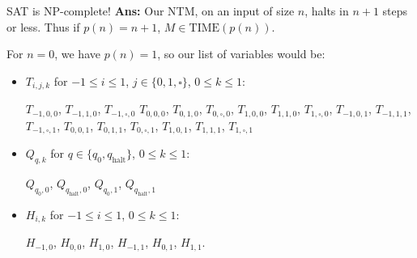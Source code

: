 \documentclass{beamer}
\begin{document}
\begin{frame}{SAT is NP-complete!}
\textbf{Ans:} Our NTM, on an input of size $n$, halts in $n + 1$ steps or less. Thus if $p(n) = n + 1$, $M \in \mathrm{TIME}(p(n))$.

For $n = 0$, we have $p(n) = 1$, so our list of variables would be:

\begin{itemize}
    \item $T_{i, j, k}$ for $-1 \leq i \leq 1$, $j \in \{0, 1, \square\}$, $0 \leq k \leq 1$:
    
   $T_{-1, 0, 0}$, $T_{-1, 1, 0}$, $T_{-1, \square, 0}$ $T_{0, 0, 0}$, $T_{0, 1, 0}$, $T_{0, \square, 0}$, $T_{1, 0, 0}$, $T_{1, 1, 0}$, $T_{1, \square, 0}$,
   $T_{-1, 0, 1}$, $T_{-1, 1, 1}$, $T_{-1, \square, 1}$, $T_{0, 0, 1}$, $T_{0, 1, 1}$, $T_{0, \square, 1}$, $T_{1, 0, 1}$, $T_{1, 1, 1}$, $T_{1, \square, 1}$
   
   \item $Q_{q, k}$ for $q \in \{q_0, q_\text{halt}\}$, $0 \leq k \leq 1$:
   
    $Q_{q_0, 0}$, $Q_{q_\text{halt}, 0}$, $Q_{q_0, 1}$, $Q_{q_\text{halt}, 1}$
    
   \item $H_{i, k}$ for $-1 \leq i \leq 1$, $0 \leq k \leq 1$:
   
    $H_{-1, 0}$, $H_{0, 0}$, $H_{1, 0}$, $H_{-1, 1}$, $H_{0, 1}$, $H_{1, 1}$. 
    
\end{itemize}

\end{frame}
\end{document}

